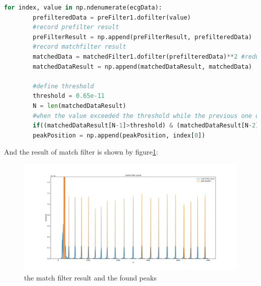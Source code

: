 \documentclass[a4paper,12pt]{article}
\begin{document}
\begin{lstlisting}[language=Python]
for index, value in np.ndenumerate(ecgData):
		prefilteredData = preFilter1.dofilter(value)
		#record prefilter result
		preFilterResult = np.append(preFilterResult, prefilteredData)
		#record matchfilter result
		matchedData = matchedFilter1.dofilter(prefilteredData)**2 #reduce S/N ratio
		matchedDataResult = np.append(matchedDataResult, matchedData)
		
		#define threshold
		threshold = 0.65e-11
		N = len(matchedDataResult)
		#when the value exceeded the threshold while the previous one didn't
		if((matchedDataResult[N-1]>threshold) & (matchedDataResult[N-2] > threshold)):
		peakPosition = np.append(peakPosition, index[0])
\end{lstlisting}
And the result of match filter is shown by figure\ref{fig_matchResult}:
\begin{figure}[H]   
	\centering 
	\includegraphics[width=12cm]{../Figures/matchResult.pdf} 
	\caption{the match filter result and the found peaks} 
	\label{fig_matchResult}
\end{figure}
\end{document}
